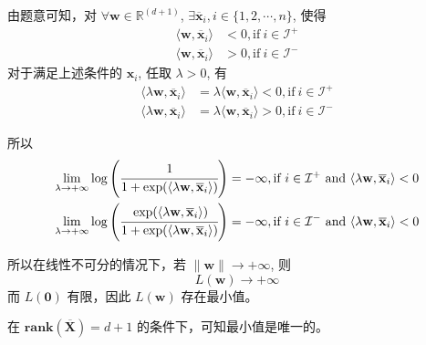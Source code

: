 \documentclass[11pt,letter,notitlepage]{article}
\newcommand{\rank}[1]{ \textbf{rank}  (#1)  }
\begin{document}
\begin{solution}
\begin{enumerate}
		      由题意可知，对 $\forall \mathbf{w}\in \mathbb{R}^{(d+1)}$, $\exists \overline{\mathbf{x}}_i, i\in\{1,2,\cdots,n\}$, 使得
		      $$\begin{aligned}
				      \langle \mathbf{w},\overline{\mathbf{x}}_i \rangle & < 0, \text{if}\ i \in \mathcal{I}^+ \\
				      \langle \mathbf{w},\overline{\mathbf{x}}_i \rangle & > 0, \text{if}\ i \in \mathcal{I}^-
			      \end{aligned}$$
		      对于满足上述条件的 $\mathbf{x}_i$, 任取 $\lambda>0$, 有
		      $$\begin{aligned}
				      \langle \lambda\mathbf{w},\overline{\mathbf{x}}_i \rangle & = \lambda\langle \mathbf{w},\overline{\mathbf{x}}_i \rangle < 0, \text{if}\ i \in \mathcal{I}^+ \\
				      \langle \lambda\mathbf{w},\overline{\mathbf{x}}_i \rangle & = \lambda\langle \mathbf{w},\overline{\mathbf{x}}_i \rangle> 0, \text{if}\ i \in \mathcal{I}^-
			      \end{aligned}$$

		      所以
		      $$\begin{aligned}
				      \lim_{\lambda\to +\infty} \log\left( \cfrac{1}{1+\exp(\langle \lambda\mathbf{w},\overline{\mathbf{x}}_i \rangle)} \right)                                                               & = -\infty, \text{if}\ i \in \mathcal{I}^+\ \text{and}\ \langle \lambda\mathbf{w},\overline{\mathbf{x}}_i \rangle <0 \\
				      \lim_{\lambda\to +\infty} \log\left( \cfrac{\exp(\langle \lambda\mathbf{w},\overline{\mathbf{x}}_i \rangle)}{1+\exp(\langle \lambda\mathbf{w},\overline{\mathbf{x}}_i \rangle)} \right) & = -\infty, \text{if}\ i \in \mathcal{I}^-\ \text{and}\ \langle \lambda\mathbf{w},\overline{\mathbf{x}}_i \rangle <0
			      \end{aligned}$$

		      所以在线性不可分的情况下，若 $\|\mathbf{w}\|\to+\infty$, 则
		      $$L(\mathbf{w})\to+\infty$$
		      而 $L(\mathbf{0})$ 有限，因此 $L(\mathbf{w})$ 存在最小值。

		      在 $\rank{\overline{\mathbf{X}}}=d+1$ 的条件下，可知最小值是唯一的。

	\end{enumerate}
\end{solution}
\end{document}
